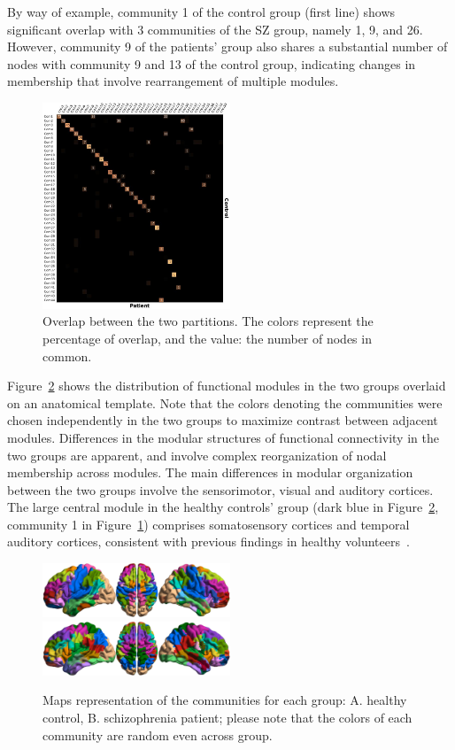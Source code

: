 By way of example, community 1 of the control group (first line) shows significant overlap with 3 communities of the SZ group, namely 1, 9, and 26. 
However, community 9 of the patients' group also shares a substantial number of nodes with community 9 and 13 of the control group, indicating changes in membership that involve rearrangement of multiple modules. 
\begin{figure}
\centering
\includegraphics[width=0.5\textwidth]{images/schizo/schizo_fig_4.jpg}
\caption{Overlap between the two partitions. The colors represent the percentage of overlap, and the value: the number of nodes in common.}
\label{fig:schizo_figure4}
\end{figure}

Figure~\ref{fig:schizo_figure5} shows the distribution of functional modules in the two groups overlaid on an anatomical template.
Note that the colors denoting the communities were chosen independently in the two groups to maximize contrast between adjacent modules.
Differences in the modular structures of functional connectivity in the two groups are apparent, and involve complex reorganization of nodal membership across modules. 
The main differences in modular organization between the two groups involve the sensorimotor, visual and auditory cortices.
The large central module in the healthy controls' group (dark blue in Figure~\ref{fig:schizo_figure5}, community 1 in Figure~\ref{fig:schizo_figure4}) comprises somatosensory cortices and temporal auditory cortices, consistent with previous findings in healthy volunteers~\cite{javitt2015}.

\begin{figure}
\centering
\includegraphics[width=0.5\textwidth]{images/schizo/schizo_fig_5a.jpg}
\includegraphics[width=0.5\textwidth]{images/schizo/schizo_fig_5b.jpg}
\caption{Maps representation of the communities for each group: A. healthy control, B. schizophrenia patient; please note that the colors of each community are random even across group.}
\label{fig:schizo_figure5}
\end{figure}

